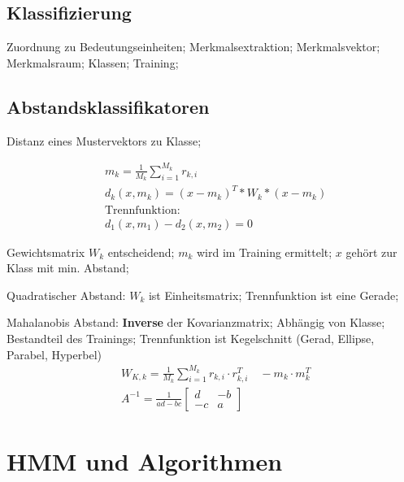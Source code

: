 \documentclass[german,color,6pt]{latex4ei/latex4ei_sheet}
\begin{document}
\begin{sectionbox}
\subsection{Klassifizierung}
Zuordnung zu Bedeutungseinheiten; Merkmalsextraktion; Merkmalsvektor; Merkmalsraum; Klassen; Training;
\end{sectionbox}

\begin{sectionbox}
\subsection{Abstandsklassifikatoren}
Distanz eines Mustervektors zu Klasse;

\begin{equation*}
\begin{split}
 & m_k = \frac{1}{M_k} \sum\limits^{M_k}_{i=1} r_{k,i} \\
 & d_k (x, m_k) = (x - m_k)^T * W_k * (x-m_k) \\
 & \text{Trennfunktion: } \\
 & d_1 (x, m_1) - d_2 (x, m_2) = 0
\end{split}
\end{equation*}

Gewichtsmatrix $W_k$ entscheidend; $m_k$ wird im Training ermittelt; $x$ gehört zur Klass mit min. Abstand;

Quadratischer Abstand: $W_k$ ist Einheitsmatrix; Trennfunktion ist eine Gerade;

Mahalanobis Abstand: \textbf{Inverse} der Kovarianzmatrix; Abhängig von Klasse; Bestandteil des Trainings; Trennfunktion ist Kegelschnitt (Gerad, Ellipse, Parabel, Hyperbel)
\begin{equation*}
\begin{split}
	& W_{K,k} = \frac{1}{M_k} \sum\limits^{M_k}_{i=1} r_{k,i} \cdot r^T_{k,i} \quad -m_k \cdot m_k^T \\
	& A^{-1} = \frac{1}{ad-bc}\begin{bmatrix} d & -b \\ -c & a \end{bmatrix}
\end{split}
\end{equation*}
\end{sectionbox}

\columnbreak


\section{HMM und Algorithmen}
\end{document}
